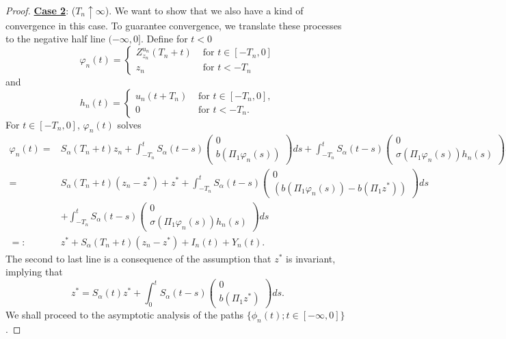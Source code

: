 \documentclass[10pt, reqno]{amsart}
\theoremstyle{definition}
\numberwithin{lem}{section}
\numberwithin{cor}{section}
\numberwithin{prop}{section}
\numberwithin{thm}{section}
\numberwithin{dfn}{section}
\begin{document}
\begin{proof}
\noindent \underline{\textbf{Case 2}}: ($T_n\uparrow \infty$). We want to show that we also have a kind of convergence in this case. To guarantee convergence, we translate these processes to the negative half line $(-\infty,0]$. Define for $t<0$
\begin{equation*}
    \varphi_n(t) = \begin{cases}
        Z^{u_n}_{z_n}(T_n + t) & \text{ for } t \in [-T_n,0] \\
        z_n & \text{ for } t < -T_n
    \end{cases}
\end{equation*}
and
\begin{equation}\label{eq:hnDefinition}
    h_n(t) = 
    \begin{cases} 
        u_n(t + T_n) &\text{ for } t \in [-T_n,0], \\
        0 &\text{ for } t<-T_n.
    \end{cases}
\end{equation}
For $t \in [-T_n,0]$, $\varphi_n(t)$ solves
\begin{align*}
    \varphi_n(t) = &S_\alpha(T_n + t)z_n + \int_{-T_n}^t S_\alpha(t-s) \begin{pmatrix}
        0 \\ b(\Pi_1 \varphi_n(s))
    \end{pmatrix}
    ds \nonumber+ \int_{-T_n}^t S_\alpha(t-s) \begin{pmatrix}  0 \\ \sigma(\Pi_1 \varphi_n(s))h_n(s) \end{pmatrix}ds \nonumber\\
    = &S_\alpha(T_n + t)(z_n-z^*) + z^* + \int_{-T_n}^t S_\alpha(t-s) \begin{pmatrix}
        0 \\ (b(\Pi_1 \varphi_n(s)) - b(\Pi_1 z^*))
    \end{pmatrix}
    ds \nonumber\\
    &+ \int_{-T_n}^t S_\alpha(t-s) \begin{pmatrix}  0 \\ \sigma(\Pi_1 \varphi_n(s))h_n(s) \end{pmatrix} ds\nonumber\\
    =:& z^* +  S_\alpha(T_n + t) (z_n - z^*) + I_n(t) + Y_n(t).
\end{align*}
The second to last line is a consequence of the assumption that $z^*$ is invariant,  implying that
\[z^* = S_\alpha(t)z^* + \int_0^t S_\alpha(t-s) \begin{pmatrix} 0 \\ b(\Pi_1 z^*) \end{pmatrix} ds.\]
We shall proceed to the asymptotic analysis of the paths $\{\phi_n(t);t\in[-\infty, 0]\}$.



\end{proof}
\end{document}
